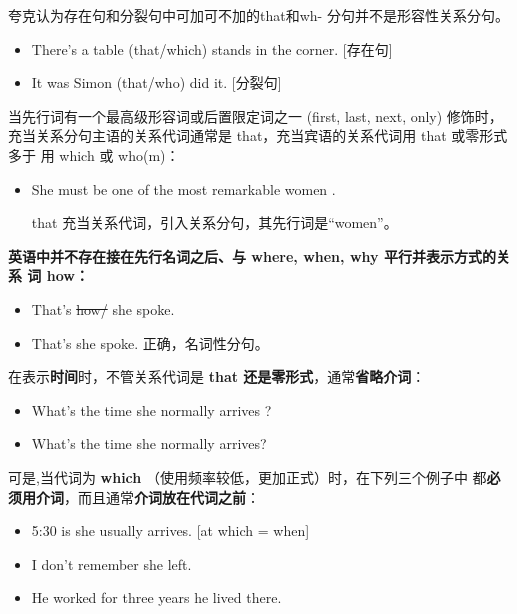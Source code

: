 夸克认为存在句和分裂句中可加可不加的that和wh- 分句并不是形容性关系分句。
\begin{itemize}
\item There's a table (that/which) stands in the corner. [存在句]

\item It was Simon (that/who) did it. [分裂句]
\end{itemize}

当先行词有一个最高级形容词或后置限定词之一 (first, last, next, only) 修饰时，
充当关系分句主语的关系代词通常是 that，充当宾语的关系代词用 that 或零形式多于
用 which 或 who(m)：
\begin{itemize}
\item She must be one of the most remarkable women .

  that 充当关系代词，引入关系分句，其先行词是“women”。
\end{itemize}

\textbf{英语中并不存在接在先行名词之后、与 where, when, why 平行并表示方式的关系
  词 how：}
\begin{itemize}

\item That's  \sout{how/} she spoke.

\item That's  she spoke. 正确，名词性分句。
\end{itemize}

在表示\textbf{时间}时，不管关系代词是 \textbf{that 还是零形式}，通常\textbf{省略介词}：
\begin{itemize}
\item What's the time  she normally arrives ?
\item What's the time  she normally arrives?
\end{itemize}

可是,当代词为 \textbf{which} （使用频率较低，更加正式）时，在下列三个例子中
都\textbf{必须用介词}，而且通常\textbf{介词放在代词之前}：
\begin{itemize}
\item 5:30 is  she usually arrives. [at which =
  when]
\item I don't remember  she left.

\item He worked for three years  he lived there.
\end{itemize}

